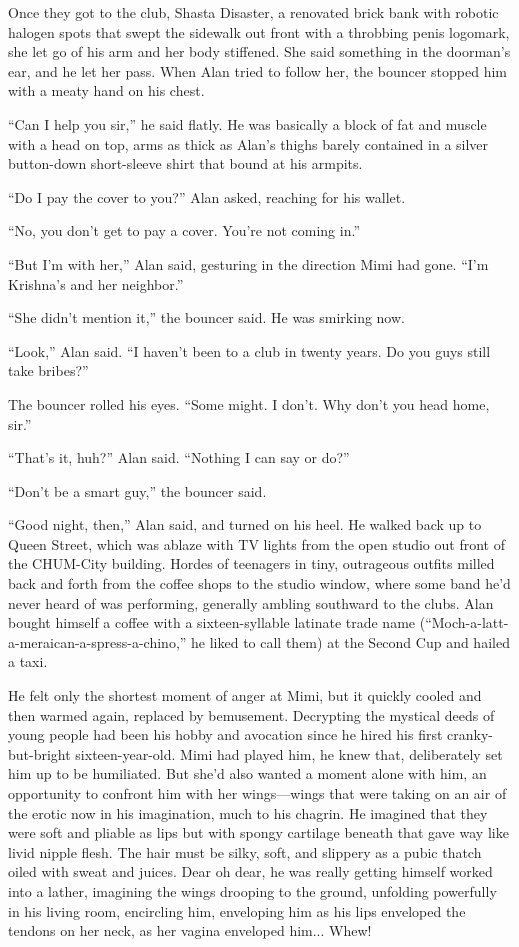 Once they got to the club, Shasta Disaster, a renovated brick bank
with robotic halogen spots that swept the sidewalk out front with a
throbbing penis logomark, she let go of his arm and her body
stiffened.  She said something in the doorman's ear, and he let her
pass.  When Alan tried to follow her, the bouncer stopped him with a
meaty hand on his chest.

``Can I help you sir,'' he said flatly.  He was basically a block of
fat and muscle with a head on top, arms as thick as Alan's thighs
barely contained in a silver button-down short-sleeve shirt that bound
at his armpits.

``Do I pay the cover to you?'' Alan asked, reaching for his wallet.

``No, you don't get to pay a cover.  You're not coming in.''

``But I'm with her,'' Alan said, gesturing in the direction Mimi had
gone.  ``I'm Krishna's and her neighbor.''

``She didn't mention it,'' the bouncer said.  He was smirking now.

``Look,'' Alan said.  ``I haven't been to a club in twenty years.  Do
you guys still take bribes?''

The bouncer rolled his eyes.  ``Some might.  I don't.  Why don't you
head home, sir.''

``That's it, huh?'' Alan said.  ``Nothing I can say or do?''

``Don't be a smart guy,'' the bouncer said.

``Good night, then,'' Alan said, and turned on his heel.  He walked
back up to Queen Street, which was ablaze with TV lights from the open
studio out front of the CHUM-City building.  Hordes of teenagers in
tiny, outrageous outfits milled back and forth from the coffee shops
to the studio window, where some band he'd never heard of was
performing, generally ambling southward to the clubs.  Alan bought
himself a coffee with a sixteen-syllable latinate trade name
(``Moch-a-latt-a-meraican-a-spress-a-chino,'' he liked to call them)
at the Second Cup and hailed a taxi.

He felt only the shortest moment of anger at Mimi, but it quickly
cooled and then warmed again, replaced by bemusement.  Decrypting the
mystical deeds of young people had been his hobby and avocation since
he hired his first cranky-but-bright sixteen-year-old.  Mimi had
played him, he knew that, deliberately set him up to be humiliated. 
But she'd also wanted a moment alone with him, an opportunity to
confront him with her wings---wings that were taking on an air of the
erotic now in his imagination, much to his chagrin.  He imagined that
they were soft and pliable as lips but with spongy cartilage beneath
that gave way like livid nipple flesh.  The hair must be silky, soft,
and slippery as a pubic thatch oiled with sweat and juices.  Dear oh
dear, he was really getting himself worked into a lather, imagining
the wings drooping to the ground, unfolding powerfully in his living
room, encircling him, enveloping him as his lips enveloped the tendons
on her neck, as her vagina enveloped him...  Whew!

